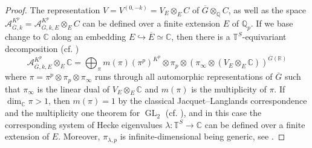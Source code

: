 \documentclass{article}
\theoremstyle{definition}
\def\calA{\mathcal{A}}
\def\bbC{\mathbb{C}}
\def\bbQ{\mathbb{Q}}
\def\bbR{\mathbb{R}}
\def\bbT{\mathbb{T}}
\DeclareMathOperator{\GL}{GL}
\def\bar{\overline}
\begin{document}
\begin{proof}
    The representation $V=V^{(0,-k)}=V_E\otimes_EC$ of $\bar G\otimes_{\bbQ}C$, as well as the space $\calA^{K^p}_{\bar G,k}=\calA^{K^p}_{\bar G,k,E}\otimes_EC$ can be defined over a finite extension $E$ of $\bbQ_p$. If we base change to $\bbC$ along an embedding $E\hookrightarrow\overline{E}\simeq \bbC$, then there is a $\bbT^S$-equivariant decomposition (cf. \cite[Proposition 3.8.1]{loeffler2011overconvergent}) 
    \[\calA^{K^p}_{\bar G,k,E}\otimes_E\bbC=\bigoplus_{\pi}m(\pi)(\pi^p)^{K^p}\otimes \pi_{p}\otimes (\pi_{\infty}\otimes (V_E\otimes_{E}\bbC))^{\bar G(\bbR)}\]
    where $\pi=\pi^p\otimes \pi_p\otimes \pi_{\infty}$ runs through all automorphic representations of $\bar G$ such that $\pi_{\infty}$ is the linear dual of $V_E\otimes_{E}\bbC$ and $m(\pi)$ is the multiplicity of $\pi$. If $\dim_{\bbC} \pi>1$, then $m(\pi)=1$ by the classical Jacquet--Langlands correspondence and the multiplicity one theorem for $\GL_2$ (cf. \cite[Proposition 11.1.1]{langlands1970automorphic}), and in this case the corresponding system of Hecke eigenvalues $\lambda:\bbT^S\rightarrow\bbC$ can be defined over a finite extension of $E$. Moreover, $\pi_{\lambda,p}$ is infinite-dimensional being generic, see \cite[\S 11]{langlands1970automorphic}.
\end{proof}
\end{document}

